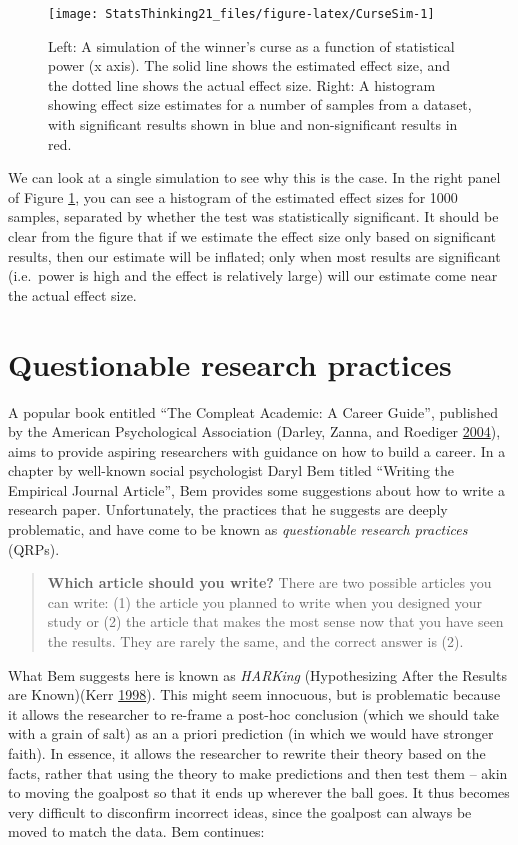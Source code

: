 \documentclass[12pt,]{book}
\theoremstyle{definition}
\theoremstyle{definition}
\theoremstyle{definition}
\theoremstyle{remark}
\begin{document}
\begin{figure}
\texttt{[image: StatsThinking21\_files/figure-latex/CurseSim-1]} \caption{Left: A simulation of the winner's curse as a function of statistical power (x axis). The solid line shows the estimated effect size, and the dotted line shows the actual effect size. Right: A histogram showing effect size estimates for a number of samples from a dataset, with significant results shown in blue and non-significant results in red. }\label{fig:CurseSim}
\end{figure}

We can look at a single simulation to see why this is the case. In the right panel of Figure \ref{fig:CurseSim}, you can see a histogram of the estimated effect sizes for 1000 samples, separated by whether the test was statistically significant. It should be clear from the figure that if we estimate the effect size only based on significant results, then our estimate will be inflated; only when most results are significant (i.e.~power is high and the effect is relatively large) will our estimate come near the actual effect size.

\hypertarget{questionable-research-practices}{%
\section{Questionable research practices}\label{questionable-research-practices}}

A popular book entitled ``The Compleat Academic: A Career Guide'', published by the American Psychological Association (Darley, Zanna, and Roediger \protect\hyperlink{ref-darl:zann:roed:2004}{2004}), aims to provide aspiring researchers with guidance on how to build a career. In a chapter by well-known social psychologist Daryl Bem titled ``Writing the Empirical Journal Article'', Bem provides some suggestions about how to write a research paper. Unfortunately, the practices that he suggests are deeply problematic, and have come to be known as \emph{questionable research practices} (QRPs).

\begin{quote}
\textbf{Which article should you write?} There are two possible articles you can write: (1) the article you planned to write when you designed your study or (2) the article that makes the most sense now that you have seen the results. They are rarely the same, and the correct answer is (2).
\end{quote}

What Bem suggests here is known as \emph{HARKing} (Hypothesizing After the Results are Known)(Kerr \protect\hyperlink{ref-kerr:1998}{1998}). This might seem innocuous, but is problematic because it allows the researcher to re-frame a post-hoc conclusion (which we should take with a grain of salt) as an a priori prediction (in which we would have stronger faith). In essence, it allows the researcher to rewrite their theory based on the facts, rather that using the theory to make predictions and then test them -- akin to moving the goalpost so that it ends up wherever the ball goes. It thus becomes very difficult to disconfirm incorrect ideas, since the goalpost can always be moved to match the data. Bem continues:
\end{document}
